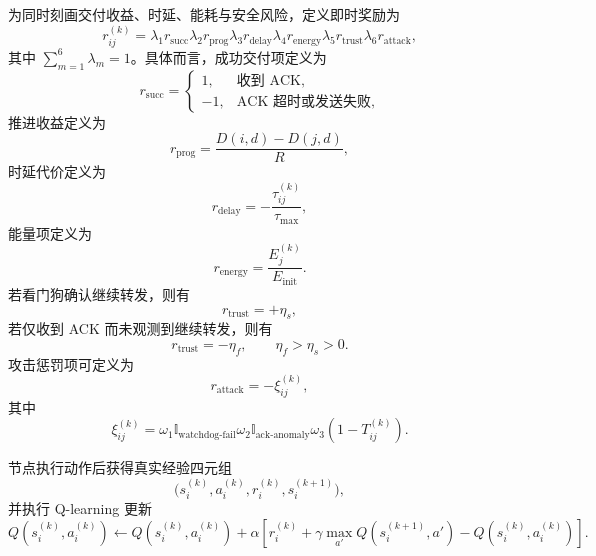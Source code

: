 为同时刻画交付收益、时延、能耗与安全风险，定义即时奖励为
\begin{equation}
r_{ij}^{(k)}=
\lambda_1 r_{\mathrm{succ}}
\lambda_2 r_{\mathrm{prog}}
\lambda_3 r_{\mathrm{delay}}
\lambda_4 r_{\mathrm{energy}}
\lambda_5 r_{\mathrm{trust}}
\lambda_6 r_{\mathrm{attack}},
\end{equation}
其中 $\sum_{m=1}^{6}\lambda_m=1$。具体而言，成功交付项定义为
\begin{equation}
r_{\mathrm{succ}}=
\begin{cases}
1, & \text{收到 ACK},\\
-1, & \text{ACK 超时或发送失败},
\end{cases}
\end{equation}
推进收益定义为
\begin{equation}
r_{\mathrm{prog}}=\frac{D(i,d)-D(j,d)}{R},
\end{equation}
时延代价定义为
\begin{equation}
r_{\mathrm{delay}}=-\frac{\tau_{ij}^{(k)}}{\tau_{\max}},
\end{equation}
能量项定义为
\begin{equation}
r_{\mathrm{energy}}=\frac{E_j^{(k)}}{E_{\mathrm{init}}}.
\end{equation}
若看门狗确认继续转发，则有
\begin{equation}
r_{\mathrm{trust}}=+\eta_s,
\end{equation}
若仅收到 ACK 而未观测到继续转发，则有
\begin{equation}
r_{\mathrm{trust}}=-\eta_f,\qquad \eta_f>\eta_s>0.
\end{equation}
攻击惩罚项可定义为
\begin{equation}
r_{\mathrm{attack}}=-\xi_{ij}^{(k)},
\end{equation}
其中
\begin{equation}
\xi_{ij}^{(k)}=
\omega_1 \mathbb{I}_{\mathrm{watchdog\text{-}fail}}
\omega_2 \mathbb{I}_{\mathrm{ack\text{-}anomaly}}
\omega_3 (1-T_{ij}^{(k)}).
\end{equation}

节点执行动作后获得真实经验四元组
\begin{equation}
\big(s_i^{(k)},a_i^{(k)},r_i^{(k)},s_i^{(k+1)}\big),
\end{equation}
并执行 Q-learning 更新
\begin{equation}
Q(s_i^{(k)},a_i^{(k)}) \leftarrow
Q(s_i^{(k)},a_i^{(k)}) +
\alpha
\left[
r_i^{(k)} +
\gamma \max_{a'} Q(s_i^{(k+1)},a') -
Q(s_i^{(k)},a_i^{(k)})
\right].
\end{equation}

